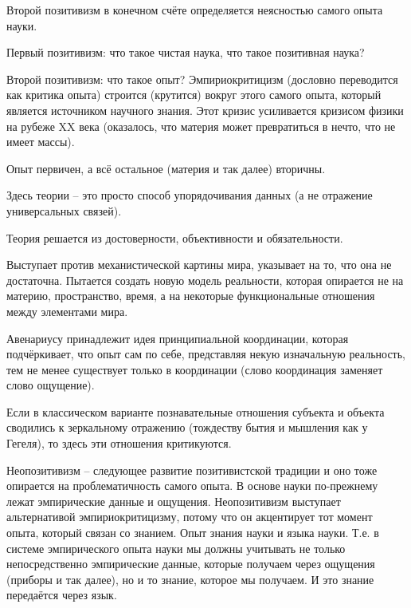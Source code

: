 \documentclass[main.tex]{subfiles}
\begin{document}


Второй позитивизм в конечном счёте определяется неясностью самого опыта науки.

Первый позитивизм: что такое чистая наука, что такое позитивная наука?

Второй позитивизм: что такое опыт?
Эмпириокритицизм (дословно переводится как критика опыта) строится (крутится) вокруг этого самого опыта, который является источником научного знания.
Этот кризис усиливается кризисом физики на рубеже XX века (оказалось, что материя может превратиться в нечто, что не имеет массы).

Опыт первичен, а всё остальное (материя и так далее) вторичны.



Здесь теории -- это просто способ упорядочивания данных (а не отражение универсальных связей).

Теория решается из достоверности, объективности и обязательности.

Выступает против механистической картины мира, указывает на то, что она не достаточна.
Пытается создать новую модель реальности, которая опирается не на материю, пространство, время, а на некоторые функциональные отношения между элементами мира.



Авенариусу принадлежит идея принципиальной координации, которая подчёркивает, что опыт сам по себе, представляя некую изначальную реальность, тем не менее существует только в координации (слово координация заменяет слово ощущение).

Если в классическом варианте познавательные отношения субъекта и объекта сводились к зеркальному отражению (тождеству бытия и мышления как у Гегеля), то здесь эти отношения критикуются. 



Неопозитивизм -- следующее развитие позитивистской традиции и оно тоже опирается на проблематичность самого опыта.
В основе науки по-прежнему лежат эмпирические данные и ощущения.
Неопозитивизм выступает альтернативой эмпириокритицизму, потому что он акцентирует тот момент опыта, который связан со знанием.
Опыт знания науки и языка науки.
Т.е. в системе эмпирического опыта науки мы должны учитывать не только непосредственно эмпирические данные, которые получаем через ощущения (приборы и так далее), но и то знание, которое мы получаем.
И это знание передаётся через язык.
\end{document}
